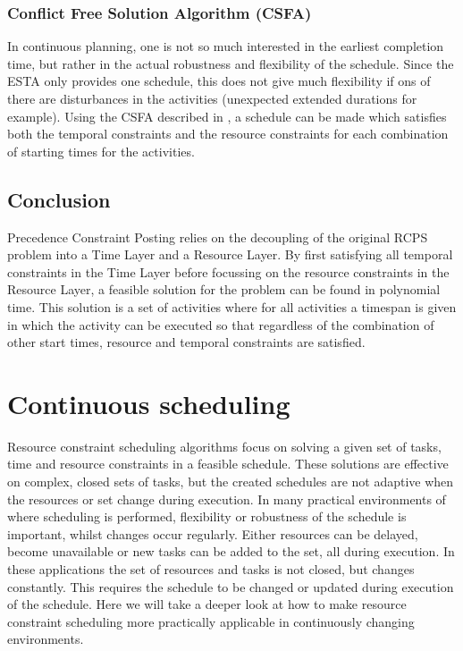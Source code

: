 \documentclass{article}
\begin{document}
\subsubsection{Conflict Free Solution Algorithm (CSFA)}
In continuous planning, one is not so much interested in the earliest completion time, but rather in the actual robustness and flexibility of the schedule. Since the ESTA only provides one schedule, this does not give much flexibility if ons of there are disturbances in the activities (unexpected extended durations for example). Using the CSFA described in \cite{cesta98}, a schedule can be made which satisfies both the temporal constraints and the resource constraints for each combination of starting times for the activities.

\subsection{Conclusion}
Precedence Constraint Posting relies on the decoupling of the original RCPS problem into a Time Layer and a Resource Layer. By first satisfying all temporal constraints in the Time Layer before focussing on the resource constraints in the Resource Layer, a feasible solution for the problem can be found in polynomial time. This solution is a set of activities where for all activities a timespan is given in which the activity can be executed so that regardless of the combination of other start times, resource and temporal constraints are satisfied.

\newpage

\section{Continuous scheduling}
\label{section:continuous}
Resource constraint scheduling algorithms focus on solving a given set of tasks, time and resource constraints in a feasible schedule.
These solutions are effective on complex, closed sets of tasks, but the created schedules are not adaptive when the resources or set change during execution.
In many practical environments of where scheduling is performed, flexibility or robustness of the schedule is important, whilst changes occur regularly.
Either resources can be delayed, become unavailable or new tasks can be added to the set, all during execution.
In these applications the set of resources and tasks is not closed, but changes constantly.
This requires the schedule to be changed or updated during execution of the schedule.
Here we will take a deeper look at how to make resource constraint scheduling more practically applicable in continuously changing environments.
\end{document}
